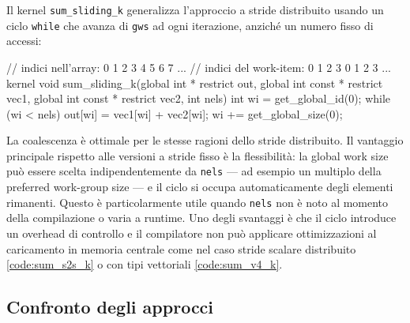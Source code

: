Il kernel \texttt{sum\_sliding\_k} generalizza l'approccio a stride distribuito usando un ciclo \texttt{while} che avanza di \texttt{gws} ad ogni iterazione, anziché un numero fisso di accessi:

\begin{code}[caption={Kernel di somma con sliding window}, label={code:sum_sliding_k}]
// indici nell'array:    0 1 2 3 4 5 6 7 ...
// indici del work-item: 0 1 2 3 0 1 2 3 ...
kernel void sum_sliding_k(global int * restrict out,
    global int const * restrict vec1,
    global int const * restrict vec2,
    int nels)
{
    int wi = get_global_id(0);
    while (wi < nels) {
        out[wi] = vec1[wi] + vec2[wi];
        wi += get_global_size(0);
    }
}
\end{code}

La coalescenza è ottimale per le stesse ragioni dello stride distribuito. Il vantaggio principale rispetto alle versioni a stride fisso è la flessibilità: la global work size può essere scelta indipendentemente da \texttt{nels} — ad esempio un multiplo della preferred work-group size — e il ciclo si occupa automaticamente degli elementi rimanenti. Questo è particolarmente utile quando \texttt{nels} non è noto al momento della compilazione o varia a runtime. Uno degli svantaggi è che il ciclo introduce un overhead di controllo e il compilatore non può applicare ottimizzazioni al caricamento in memoria centrale come nel caso stride scalare distribuito \ref{code:sum_s2s_k} o con tipi vettoriali \ref{code:sum_v4_k}.

\subsection*{Confronto degli approcci}

